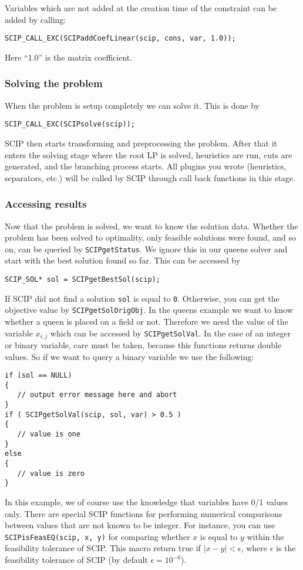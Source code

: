 \documentclass[a4paper]{article}
\begin{document}
Variables which are not added at the creation time of the constraint can be added by calling:
\begin{verbatim}
SCIP_CALL_EXC(SCIPaddCoefLinear(scip, cons, var, 1.0));
\end{verbatim}
Here ``1.0'' is the matrix coefficient.

\subsubsection{Solving the problem}

When the problem is setup completely we can solve it. This is done by
\begin{verbatim}
SCIP_CALL_EXC(SCIPsolve(scip));
\end{verbatim}
SCIP then starts transforming and preprocessing the problem. After that it enters the solving stage where the root LP is solved, heuristics are run, cuts are generated, and the branching process starts. All plugins you wrote (heuristics, separators,  etc.) will be called by SCIP through call back functions in this stage.


\subsubsection{Accessing results}

Now that the problem is solved, we want to know the solution data. Whether the problem has been solved to optimality, only feasible solutions were found, and so on, can be queried by \verb+SCIPgetStatus+. We ignore this in our queens solver and start with the best solution found so far. This can be accessed by
\begin{verbatim}
SCIP_SOL* sol = SCIPgetBestSol(scip);
\end{verbatim}
If SCIP did not find a solution \verb+sol+ is equal to \verb+0+. Otherwise, you can get the objective value by \verb+SCIPgetSolOrigObj+. In the queens example we want to know whether a queen is placed on a field or not. Therefore we need the value of the variable $x_{i,j}$ which can be accessed by \verb+SCIPgetSolVal+. In the case of an integer or binary variable, care must be taken, because this functions returns double values. So if we want to query a binary variable we use the following:
\begin{verbatim}
if (sol == NULL)
{
   // output error message here and abort
}
if ( SCIPgetSolVal(scip, sol, var) > 0.5 )
{
   // value is one
}
else
{
   // value is zero
}
\end{verbatim}
In this example, we of course use the knowledge that variables have 0/1 values only. There are special SCIP functions for performing numerical comparisons between values that are not known to be integer. For instance, you can use \verb+SCIPisFeasEQ(scip, x, y)+ for comparing whether $x$ is equal to $y$ within the feasibility tolerance of SCIP. This macro return true if $|x - y| < \epsilon$, where $\epsilon$ is the feasibility tolerance of SCIP (by default $\epsilon = 10^{-6}$).
\end{document}

